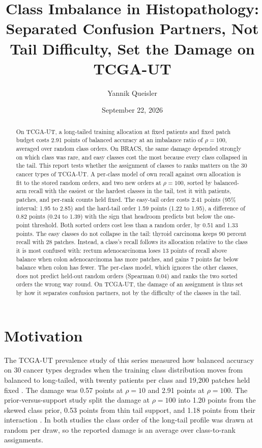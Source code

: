\documentclass[11pt]{article}
\title{Class Imbalance in Histopathology:\\Separated Confusion Partners, Not Tail Difficulty, Set the Damage on TCGA-UT}
\author{Yannik Queisler}
\date{September 22, 2026}
\begin{document}
\raggedbottom
{}
\setlength{\emergencystretch}{2em}
\maketitle
\begin{abstract}
\noindent On TCGA-UT, a long-tailed training allocation at fixed patients and fixed patch budget costs 2.91 points of balanced accuracy at an imbalance ratio of $\rho=100$, averaged over random class orders. On BRACS, the same damage depended strongly on which class was rare, and easy classes cost the most because every class collapsed in the tail. This report tests whether the assignment of classes to ranks matters on the 30 cancer types of TCGA-UT. A per-class model of own recall against own allocation is fit to the stored random orders, and two new orders at $\rho=100$, sorted by balanced-arm recall with the easiest or the hardest classes in the tail, test it with patients, patches, and per-rank counts held fixed. The easy-tail order costs 2.41 points (95\% interval: 1.95 to 2.85) and the hard-tail order 1.59 points (1.22 to 1.95), a difference of 0.82 points (0.24 to 1.39) with the sign that headroom predicts but below the one-point threshold. Both sorted orders cost less than a random order, by 0.51 and 1.33 points. The easy classes do not collapse in the tail: thyroid carcinoma keeps 90 percent recall with 28 patches. Instead, a class's recall follows its allocation relative to the class it is most confused with: rectum adenocarcinoma loses 13 points of recall above balance when colon adenocarcinoma has more patches, and gains 7 points far below balance when colon has fewer. The per-class model, which ignores the other classes, does not predict held-out random orders (Spearman 0.04) and ranks the two sorted orders the wrong way round. On TCGA-UT, the damage of an assignment is thus set by how it separates confusion partners, not by the difficulty of the classes in the tail.
\end{abstract}

\section{Motivation}
\label{sec:motivation}
The TCGA-UT prevalence study of this series measured how balanced accuracy on 30 cancer types degrades when the training class distribution moves from balanced to long-tailed, with twenty patients per class and 19,200 patches held fixed \citep{queisler2026prevalenceTcga}. The damage was 0.57 points at $\rho=10$ and 2.91 points at $\rho=100$. The prior-versus-support study split the damage at $\rho=100$ into 1.20 points from the skewed class prior, 0.53 points from thin tail support, and 1.18 points from their interaction \citep{queisler2026causeTcga}. In both studies the class order of the long-tail profile was drawn at random per draw, so the reported damage is an average over class-to-rank assignments.
\end{document}
